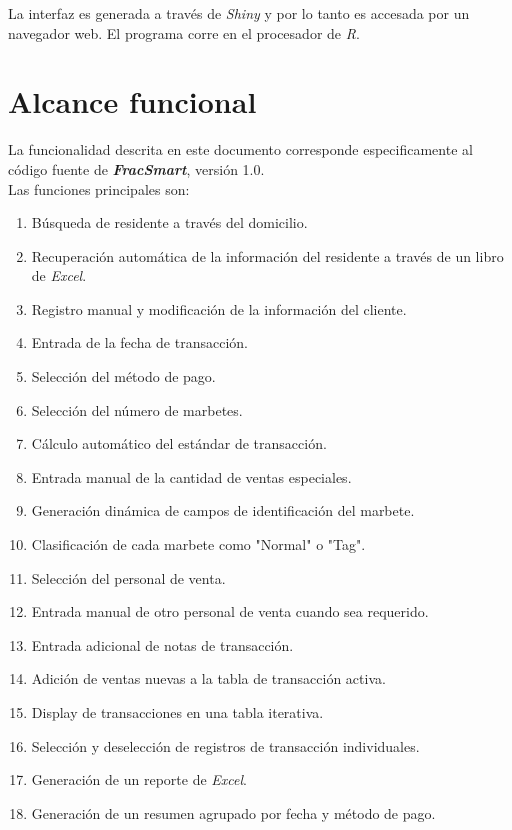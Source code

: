 \documentclass{article}
\begin{document}
\quad\quad La interfaz es generada a través de \textit{Shiny} y por lo tanto es accesada por un navegador web. El programa corre en el procesador de \textit{R}.


\newpage
\section{Alcance funcional}
\quad\quad La funcionalidad descrita en este documento corresponde especificamente al código fuente de \textbf{\textit{FracSmart}}, versión 1.0.\\

\quad\quad Las funciones principales son:
\begin{enumerate}
    \item Búsqueda de residente a través del domicilio.
    \item Recuperación automática de la información del residente a través de un libro de \textit{Excel}.
    \item Registro manual y modificación de la información del cliente.
    \item Entrada de la fecha de transacción.
    \item Selección del método de pago.
    \item Selección del número de marbetes.
    \item Cálculo automático del estándar de transacción.
    \item Entrada manual de la cantidad de ventas especiales.
    \item Generación dinámica de campos de identificación del marbete.
    \item Clasificación de cada marbete como "Normal" o "Tag".
    \item Selección del personal de venta.
    \item Entrada manual de otro personal de venta cuando sea requerido.
    \item Entrada adicional de notas de transacción.
    \item Adición de ventas nuevas a la tabla de transacción activa.
    \item Display de transacciones en una tabla iterativa.
    \item Selección y deselección de registros de transacción individuales.
    \item Generación de un reporte de \textit{Excel}.
    \item Generación de un resumen agrupado por fecha y método de pago.        
\end{enumerate}
\end{document}
